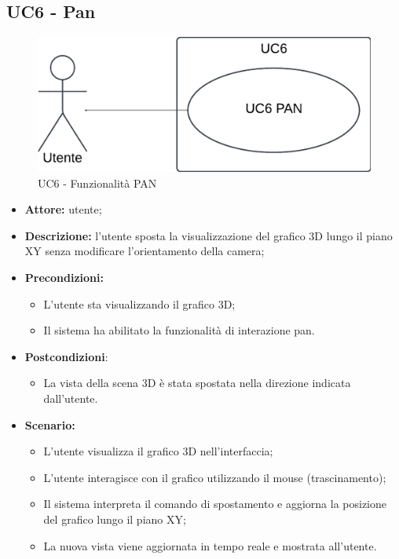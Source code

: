 \subsection{UC6 - Pan}
\begin{figure}[h!]
    \centering
    \includegraphics[scale=0.7]{template/images/UC6.png}
    \caption{UC6 - Funzionalità PAN}
\end{figure}
\begin{itemize}
    \item \textbf{Attore:} utente;
    \item \textbf{Descrizione:} l'utente sposta la visualizzazione del grafico 3D lungo il piano XY senza modificare l'orientamento della camera;
    \item \textbf{Precondizioni:}
    \begin{itemize}
        \item L'utente sta visualizzando il grafico 3D;
        \item Il sistema ha abilitato la funzionalità di interazione pan.
    \end{itemize}
    \item \textbf{Postcondizioni}:
    \begin{itemize}
        \item La vista della scena 3D è stata spostata nella direzione indicata dall'utente.
    \end{itemize}
    \item \textbf{Scenario:}
    \begin{itemize}
        \item L'utente visualizza il grafico 3D nell'interfaccia;
        \item L'utente interagisce con il grafico utilizzando il mouse (trascinamento);
        \item Il sistema interpreta il comando di spostamento e aggiorna la posizione del grafico lungo il piano XY;
        \item La nuova vista viene aggiornata in tempo reale e mostrata all'utente.
    \end{itemize}
\end{itemize}

